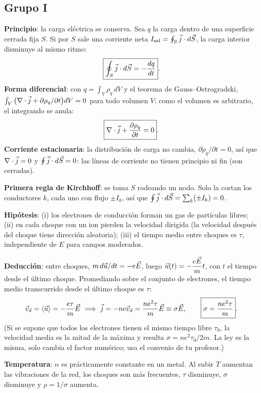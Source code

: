 
\subsection*{Grupo I}
\textbf{Principio}: la carga eléctrica se conserva. Sea $q$ la carga dentro de una superficie cerrada fija $S$. Si por $S$ sale una corriente neta $I_{\text{sal}}=\oint_S\vec{j}\cdot d\vec S$, la carga interior disminuye al mismo ritmo:
\[
\boxed{\oint_S\vec{j}\cdot d\vec S=-\frac{dq}{dt}}.
\]
\textbf{Forma diferencial}: con $q=\int_V\rho_q\,dV$ y el teorema de Gauss--Ostrogradski, $\int_V\big(\nabla\cdot\vec{j}+\partial\rho_q/\partial t\big)dV=0$ para todo volumen $V$; como el volumen es arbitrario, el integrando se anula:
\[
\boxed{\nabla\cdot\vec{j}+\frac{\partial\rho_q}{\partial t}=0}.
\]
\textbf{Corriente estacionaria}: la distribución de carga no cambia, $\partial\rho_q/\partial t=0$, así que $\nabla\cdot\vec{j}=0$ y $\oint\vec{j}\cdot d\vec S=0$: las líneas de corriente no tienen principio ni fin (son cerradas).

\textbf{Primera regla de Kirchhoff}: se toma $S$ rodeando un nodo. Solo la cortan los conductores $k$, cada uno con flujo $\pm I_k$, así que $\oint\vec{j}\cdot d\vec S=\sum_k(\pm I_k)=0$.

\textbf{Hipótesis}: (i) los electrones de conducción forman un gas de partículas libres; (ii) en cada choque con un ion pierden la velocidad dirigida (la velocidad después del choque tiene dirección aleatoria); (iii) el tiempo medio entre choques es $\tau$, independiente de $E$ para campos moderados.

\textbf{Deducción}: entre choques, $m\,d\vec u/dt=-e\vec{E}$, luego $\vec u(t)=-\dfrac{e\vec{E}}{m}t$, con $t$ el tiempo desde el último choque. Promediando sobre el conjunto de electrones, el tiempo medio transcurrido desde el último choque es $\tau$:
\[
\vec v_d=\langle\vec u\rangle=-\frac{e\tau}{m}\vec{E}\ \Longrightarrow\ \vec{j}=-ne\vec v_d=\frac{ne^2\tau}{m}\vec{E}\equiv\sigma\vec{E},\qquad\boxed{\sigma=\frac{ne^2\tau}{m}}.
\]
(Si se supone que todos los electrones tienen el mismo tiempo libre $\tau_0$, la velocidad media es la mitad de la máxima y resulta $\sigma=ne^2\tau_0/2m$. La ley es la misma, solo cambia el factor numérico; usa el convenio de tu profesor.)

\textbf{Temperatura}: $n$ es prácticamente constante en un metal. Al subir $T$ aumentan las vibraciones de la red, los choques son más frecuentes, $\tau$ disminuye, $\sigma$ disminuye y $\rho=1/\sigma$ aumenta.

